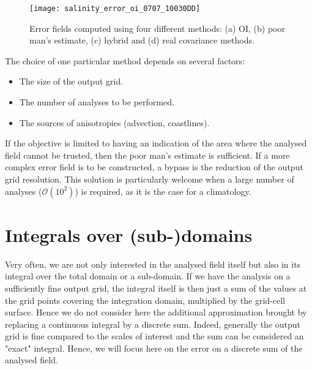 \begin{figure*}[htpb]
\centering
\texttt{[image: salinity\_error\_oi\_0707\_10030DD]}
\caption[Error fields computed using four different methods.]{Error fields computed using four different methods: (a) OI, (b) poor man's estimate, (c) hybrid and (d) real covariance methods.\label{fig:salinity_error_oi_0707_10030DD}}
\end{figure*}

The choice of one particular method depends on several factors:
\begin{itemize}
\item The size of the output grid.
\item The number of analyses to be performed.
\item The sources of anisotropies (advection, coastlines).
\end{itemize} 

If the objective is limited to having an indication of the area where the analysed field cannot be trusted, then the poor man's estimate is sufficient. If a more complex error field is to be constructed, a bypass is the reduction of the output grid resolution. This solution is particularly welcome when a large number of analyses ($\mathcal{O}(10^{2})$) is required, as it is the case for a climatology.






\clearpage

\section{Integrals over (sub-)domains}

Very often, we are not only interested in the analysed field itself but also in its integral over the
total domain or a sub-domain. If we have the analysis on a sufficiently fine output grid, the integral
itself is then just a sum of the values at the grid points covering the integration domain, multiplied by the
grid-cell surface. Hence we do not consider here the additional approximation brought by replacing a continuous integral by
a discrete sum. Indeed, generally the output grid is fine compared to the scales of interest
and the sum can be considered an "exact" integral. Hence, we will focus here on the error on a discrete sum of the analysed field.

